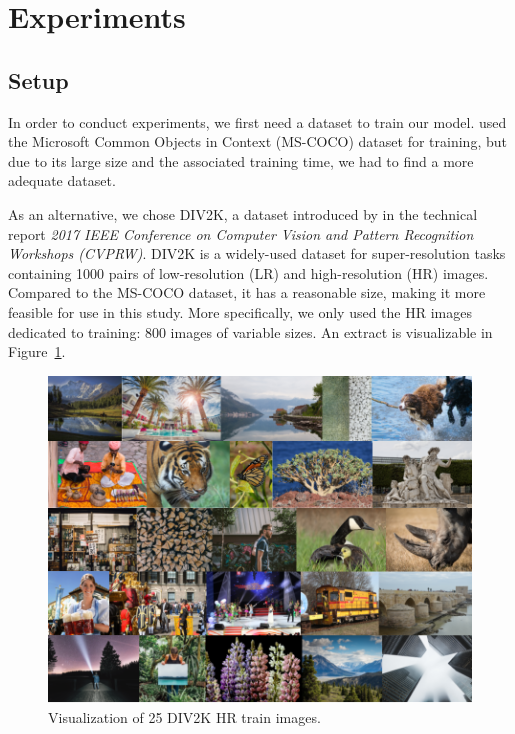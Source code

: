 \documentclass{article}
\begin{document}
{
    \section{Experiments}
    \label{sec:experiments}

    {
        \subsection{Setup}
        \label{subsec:setup}

        In order to conduct experiments, we first need a dataset to train our model. \cite{sr} used the Microsoft Common Objects in Context (MS-COCO) dataset \citep{mscoco} for training, but due to its large size and the associated training time, we had to find a more adequate dataset.

        As an alternative, we chose DIV2K, a dataset introduced by \cite{div2k_ds} in the technical report \textit{2017 IEEE Conference on Computer Vision and Pattern Recognition Workshops (CVPRW)}. DIV2K is a widely-used dataset for super-resolution tasks containing 1000 pairs of low-resolution (LR) and high-resolution (HR) images. Compared to the MS-COCO dataset, it has a reasonable size, making it more feasible for use in this study. More specifically, we only used the HR images dedicated to training: 800 images of variable sizes. An extract is visualizable in Figure~\ref{fig:div2k-train-og}.

        \begin{figure}[ht]
            \centering
            \includegraphics[width=\textwidth]{images/DIV2K_HR.png}
            \caption{Visualization of 25 DIV2K HR train images.}
            \label{fig:div2k-train-og}
        \end{figure}

}}
\end{document}
